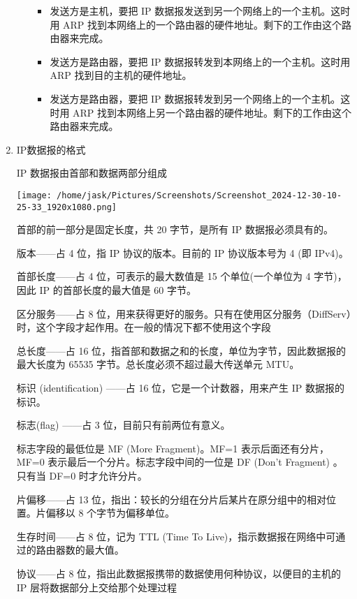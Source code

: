 \documentclass[11pt]{article}
\begin{document}
\begin{enumerate}
\begin{itemize}
\begin{itemize}
\item 发送方是主机，要把 IP 数据报发送到另一个网络上的一个主机。这时用 ARP 找到本网络上的一个路由器的硬件地址。剩下的工作由这个路由器来完成。

\item 发送方是路由器，要把 IP 数据报转发到本网络上的一个主机。这时用 ARP 找到目的主机的硬件地址。

\item 发送方是路由器，要把 IP 数据报转发到另一个网络上的一个主机。这时用 ARP 找到本网络上另一个路由器的硬件地址。剩下的工作由这个路由器来完成。
\end{itemize}
\end{itemize}
\item IP数据报的格式
\label{sec:org24bb396}

IP 数据报由首部和数据两部分组成


\begin{center}
\texttt{[image: /home/jask/Pictures/Screenshots/Screenshot\_2024-12-30-10-25-33\_1920x1080.png]}
\end{center}

首部的前一部分是固定长度，共 20 字节，是所有 IP 数据报必须具有的。

版本——占 4 位，指 IP 协议的版本。目前的 IP 协议版本号为 4 (即 IPv4)。

首部长度——占 4 位，可表示的最大数值是 15 个单位(一个单位为 4 字节)，因此 IP 的首部长度的最大值是 60 字节。

区分服务——占 8 位，用来获得更好的服务。只有在使用区分服务（DiffServ）时，这个字段才起作用。在一般的情况下都不使用这个字段 

总长度——占 16 位，指首部和数据之和的长度，单位为字节，因此数据报的最大长度为 65535 字节。总长度必须不超过最大传送单元 MTU。

标识 (identification) ——占 16 位，它是一个计数器，用来产生 IP 数据报的标识。 

标志(flag) ——占 3 位，目前只有前两位有意义。

标志字段的最低位是 MF (More Fragment)。MF=1 表示后面还有分片，MF=0 表示最后一个分片。标志字段中间的一位是 DF (Don't Fragment) 。只有当 DF=0 时才允许分片。 

片偏移——占 13 位，指出：较长的分组在分片后某片在原分组中的相对位置。片偏移以 8 个字节为偏移单位。

生存时间——占 8 位，记为 TTL (Time To Live)，指示数据报在网络中可通过的路由器数的最大值。

协议——占 8 位，指出此数据报携带的数据使用何种协议，以便目的主机的 IP 层将数据部分上交给那个处理过程


\end{enumerate}
\end{document}

